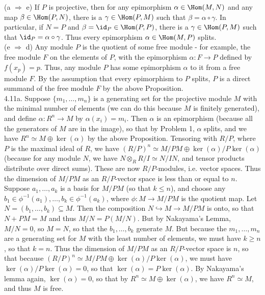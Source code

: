 \documentclass[11pt]{article}
\begin{document}
(a $\Rightarrow$ e) If $P$ is projective, then for any epimorphism
$\alpha\in\Hom(M,N)$ and any map $\beta\in\Hom(P,N)$, there is a
$\gamma\in\Hom(P,M)$ such that $\beta=\alpha\circ\gamma$. In particular,
if $N=P$ and $\beta=\id_P\in\Hom(P,P)$, there is a $\gamma\in\Hom(P,M)$ such
that $\id_P=\alpha\circ\gamma$. Thus every epimorphism $\alpha\in\Hom(M,P)$
splits.\\

(e $\Rightarrow$ d) Any module $P$ is the quotient of some free module - for
example, the free module $F$ on the elements of $P$, with the epimorphism
$\alpha:F\rightarrow P$ defined by $f(x_p)= p$. Thus, any module $P$ has
some epimorphism $\alpha$ to it from a free module $F$. By the assumption
that every epimorphism to $P$ splits, $P$ is a direct summand of the free
module $F$ by the above Proposition.\\

\num{4.11a.} Suppose $\{m_1,\ldots,m_n\}$ is a generating set for the
projective module $M$ with the minimal number of elements (we can do this
because $M$ is finitely generated), and define $\alpha:R^n\rightarrow M$
by $\alpha(x_i)=m_i$. Then $\alpha$ is an epimorphism (because all the
generators of $M$ are in the image), so that by Problem 1, $\alpha$ splits,
and we have $R^n\simeq M\oplus\ker(\alpha)$ by the above Proposition. Tensoring
with $R/P$, where $P$ is the maximal ideal of $R$, we have $(R/P)^n\simeq
M/PM\oplus \ker(\alpha)/P\ker(\alpha)$ (because for any module $N$, we
have $N\otimes_R R/I\simeq N/IN$, and tensor products distribute over
direct sums). These are now $R/P$-modules, i.e. vector spaces. Thus the
dimension of $M/PM$ as an $R/P$-vector space is less than or equal to
$n$. Suppose $a_1,\ldots,a_k$ is a basis for $M/PM$ (so that $k\leq n$),
and choose any $b_1\in\phi^{-1}(a_1),\ldots,b_k\in\phi^{-1}(a_k)$, where
$\phi:M\rightarrow M/PM$ is the quotient map. Let $N=(b_1,\ldots,b_k)\subseteq
M$. Then the composition $N\hookrightarrow M\rightarrow M/PM$ is onto,
so that $N+PM=M$ and thus $M/N=P(M/N)$. But by Nakayama's Lemma, $M/N=0$,
so $M=N$, so that the $b_1,\ldots,b_k$ generate $M$. But because the
$m_1,\ldots,m_n$ are a generating set for $M$ with the least number of
elements, we must have $k\geq n$, so that $k=n$. Thus the dimension of $M/PM$
as an $R/P$-vector space is $n$, so that because $(R/P)^n\simeq M/PM\oplus
\ker(\alpha)/P\ker(\alpha)$, we must have $\ker(\alpha)/P\ker(\alpha)=0$, so
that $\ker(\alpha)=P\ker(\alpha)$. By Nakayama's lemma again, $\ker(\alpha)=0$,
so that by $R^n\simeq M\oplus\ker(\alpha)$, we have $R^n\simeq M$, and thus
$M$ is free. \\
\end{document}
